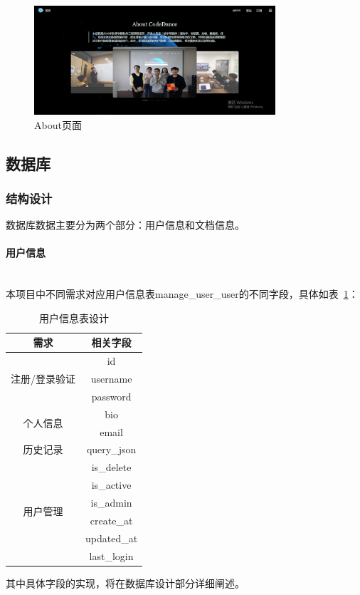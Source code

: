 \documentclass[12pt]{article}
\newcommand{\myparagraph}[1]{\paragraph{#1}\mbox{}\\}
\begin{document}
\begin{figure}[htbp]  %
    \centering  %
    \includegraphics[width=0.8\textwidth]{fig/about.png}  %
    \caption{About页面}  %
    \label{fig:about}  %
\end{figure}

\subsection{数据库}  %
\subsubsection{结构设计}
数据库数据主要分为两个部分：用户信息和文档信息。
\myparagraph{用户信息}
\indent 本项目中不同需求对应用户信息表manage\_user\_user的不同字段，具体如表~\ref{tab:manage-user-user}：
\begin{table}[h]
\caption{用户信息表设计}
\label{tab:manage-user-user}  %
\centering
\begin{tabular}{|c|c|}
\hline
需求                       & 相关字段        \\ \hline
\multirow{3}{*}{注册/登录验证} & id          \\ \cline{2-2} 
                         & username    \\ \cline{2-2} 
                         & password    \\ \hline
\multirow{2}{*}{个人信息}    & bio         \\ \cline{2-2} 
                         & email       \\ \hline
历史记录                     & query\_json \\ \hline
\multirow{6}{*}{用户管理}    & is\_delete  \\ \cline{2-2} 
                         & is\_active  \\ \cline{2-2} 
                         & is\_admin   \\ \cline{2-2} 
                         & create\_at  \\ \cline{2-2} 
                         & updated\_at \\ \cline{2-2} 
                         & last\_login \\ \hline
\end{tabular}
\end{table}
\newline
其中具体字段的实现，将在数据库设计部分详细阐述。
\end{document}
